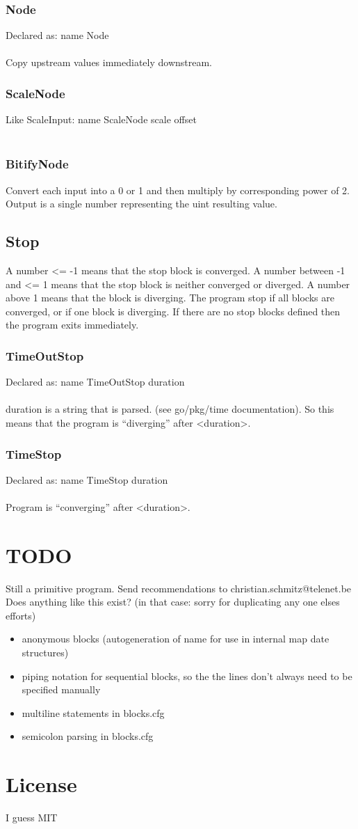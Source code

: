 \documentclass[a4paper]{article}
\begin{document}
\subsubsection{Node}
Declared as: name Node\\\\
Copy upstream values immediately downstream.
\subsubsection{ScaleNode}
Like ScaleInput: name ScaleNode scale offset\\\\
\subsubsection{BitifyNode}
Convert each input into a 0 or 1 and then multiply by corresponding power of 2. Output is a single number representing the uint resulting value.
\subsection{Stop}
A number <= -1 means that the stop block is converged. A number between -1 and <= 1 means that the stop block is neither converged or diverged. A number above 1 means that the block is diverging. The program stop if all blocks are converged, or if one block is diverging. If there are no stop blocks defined then the program exits immediately.
\subsubsection{TimeOutStop}
Declared as: name TimeOutStop duration\\\\
duration is a string that is parsed. (see go/pkg/time documentation). So this means that the program is ``diverging'' after <duration>.
\subsubsection{TimeStop}
Declared as: name TimeStop duration\\\\
Program is ``converging'' after <duration>.
\section{TODO}
Still a primitive program. Send recommendations to christian.schmitz@telenet.be
Does anything like this exist? (in that case: sorry for duplicating any one elses efforts)
\begin{itemize}
  \item anonymous blocks (autogeneration of name for use in internal map date structures)
  \item piping notation for sequential blocks, so the the lines don't always need to be specified manually
  \item multiline statements in blocks.cfg
  \item semicolon parsing in blocks.cfg
\end{itemize}
\section{License}
I guess MIT
\end{document}
